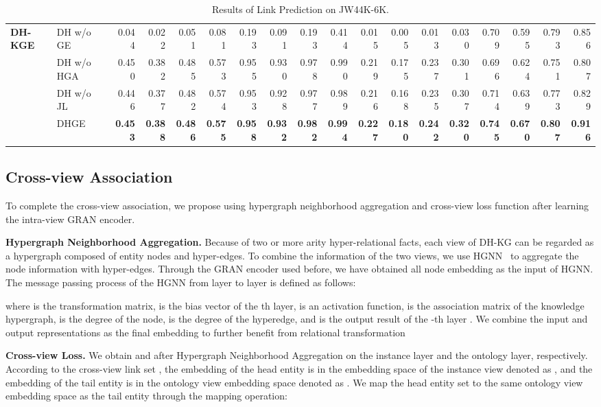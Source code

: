 \documentclass[letterpaper]{article} \usepackage{aaai23}  \usepackage{times}  \usepackage{helvet}  \usepackage{courier}  \usepackage[hyphens]{url}  \usepackage{graphicx} \urlstyle{rm} \def\UrlFont{\rm}  \usepackage{natbib}  \usepackage{caption} \frenchspacing  \setlength{\pdfpagewidth}{8.5in}  \setlength{\pdfpageheight}{11in}  \usepackage{times}
\begin{document}
\begin{table*}[t]
{\begin{tabular}{llrrrr|rrrr|rrrr|rrrr}
 \midrule \midrule
\multirow{4}{*}{\textbf{DH-KGE}} & DH w/o GE & 0.044 & 0.022 & 0.051 & 0.081 & 0.193 & 0.091 & 0.193 & 0.414 & 0.015 & 0.005 & 0.013 & 0.030 & 0.709 & 0.595 & 0.793 & 0.856 \\
 & DH w/o HGA & 0.450 & 0.382 & 0.485 & 0.573 & 0.955 & 0.930 & 0.978 & 0.990 & 0.219 & 0.175 & 0.237 & 0.301 & 0.696 & 0.624 & 0.751 & 0.807 \\
 & DH w/o JL & 0.446 & 0.377 & 0.482 & 0.574 & 0.953 & 0.928 & 0.977 & 0.989 & 0.216 & 0.168 & 0.235 & 0.307 & 0.714 & 0.639 & 0.773 & 0.829 \\
 & DHGE & \textbf{0.453} & \textbf{0.388} & \textbf{0.486} & \textbf{0.575} & \textbf{0.958} & \textbf{0.932} & \textbf{0.982} & \textbf{0.994} & \textbf{0.227} & \textbf{0.180} & \textbf{0.242} & \textbf{0.320} & \textbf{0.745} & \textbf{0.670} & \textbf{0.807} & \textbf{0.916}\\
\bottomrule                        
\end{tabular}}
\caption{\label{t4}
Results of Link Prediction on JW44K-6K. 
}
\end{table*}

\subsection{Cross-view Association}

To complete the cross-view association, we propose using hypergraph neighborhood aggregation and cross-view loss function after learning the intra-view GRAN encoder.

\textbf{Hypergraph Neighborhood Aggregation.} Because of two or more arity hyper-relational facts, each view of DH-KG can be regarded as a hypergraph  composed of entity nodes and hyper-edges. To combine the information of the two views, we use HGNN~\citep{HGNN} to aggregate the node information with hyper-edges. Through the GRAN encoder used before, we have obtained all node embedding   as the input of HGNN. The message passing process of the HGNN from layer  to layer  is defined as follows:


where  is the transformation matrix,  is the bias vector of the th layer,  is an activation function,  is the association matrix of the knowledge hypergraph,   is the degree of the node,  is the degree of the hyperedge, and  is the output result of the -th layer . We combine the input and output representations  as the final embedding to further benefit from relational transformation

\textbf{Cross-view Loss. } We obtain  and  after Hypergraph Neighborhood Aggregation on the instance layer and the ontology layer, respectively. According to the cross-view link set , the embedding of the head entity  is in the embedding space of the instance view denoted as , and the embedding of the tail entity   is in the ontology view embedding space denoted as . We map the head entity set to the same ontology view embedding space as the tail entity through the mapping operation:
\end{document}
